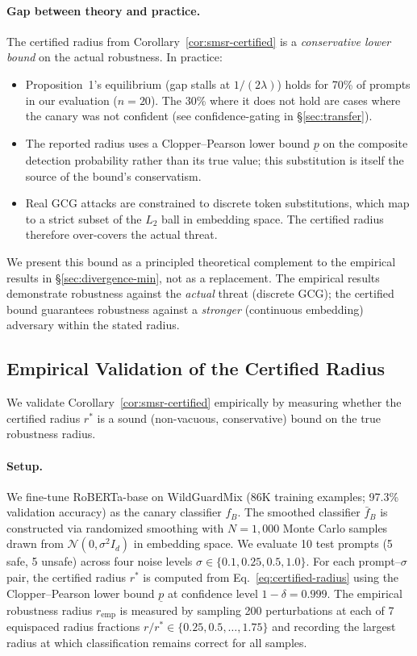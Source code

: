 \paragraph{Gap between theory and practice.}
The certified radius from Corollary~\ref{cor:smsr-certified} is a \emph{conservative lower bound} on the actual robustness. In practice:
\begin{itemize}
\item Proposition~1's equilibrium (gap stalls at $1/(2\lambda)$) holds for 70\% of prompts in our evaluation ($n=20$). The 30\% where it does not hold are cases where the canary was not confident (see confidence-gating in \S\ref{sec:transfer}).
\item The reported radius uses a Clopper--Pearson lower bound $\underline{p}$ on the composite detection probability rather than its true value; this substitution is itself the source of the bound's conservatism.
\item Real GCG attacks are constrained to discrete token substitutions, which map to a strict subset of the $L_2$ ball in embedding space. The certified radius therefore over-covers the actual threat.
\end{itemize}

We present this bound as a principled theoretical complement to the empirical results in \S\ref{sec:divergence-min}, not as a replacement. The empirical results demonstrate robustness against the \emph{actual} threat (discrete GCG); the certified bound guarantees robustness against a \emph{stronger} (continuous embedding) adversary within the stated radius.

\subsection{Empirical Validation of the Certified Radius}
\label{sec:smsr-empirical}

We validate Corollary~\ref{cor:smsr-certified} empirically by measuring whether the certified radius $r^*$ is a sound (non-vacuous, conservative) bound on the true robustness radius.

\paragraph{Setup.} We fine-tune RoBERTa-base on WildGuardMix (86K training examples; 97.3\% validation accuracy) as the canary classifier $f_B$. The smoothed classifier $\bar{f}_B$ is constructed via randomized smoothing with $N = 1{,}000$ Monte Carlo samples drawn from $\mathcal{N}(0, \sigma^2 I_d)$ in embedding space. We evaluate 10 test prompts (5 safe, 5 unsafe) across four noise levels $\sigma \in \{0.1, 0.25, 0.5, 1.0\}$. For each prompt--$\sigma$ pair, the certified radius $r^*$ is computed from Eq.~\ref{eq:certified-radius} using the Clopper--Pearson lower bound $\underline{p}$ at confidence level $1 - \delta = 0.999$. The empirical robustness radius $r_{\text{emp}}$ is measured by sampling 200 perturbations at each of 7 equispaced radius fractions $r/r^* \in \{0.25, 0.5, \ldots, 1.75\}$ and recording the largest radius at which classification remains correct for all samples.

